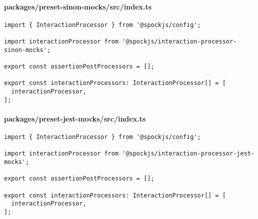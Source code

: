 \paragraph*{packages/preset-sinon-mocks/src/index.ts}
\begin{verbatim}
import { InteractionProcessor } from '@spockjs/config';

import interactionProcessor from '@spockjs/interaction-processor-sinon-mocks';

export const assertionPostProcessors = [];

export const interactionProcessors: InteractionProcessor[] = [
  interactionProcessor,
];
\end{verbatim}

\paragraph*{packages/preset-jest-mocks/src/index.ts}
\begin{verbatim}
import { InteractionProcessor } from '@spockjs/config';

import interactionProcessor from '@spockjs/interaction-processor-jest-mocks';

export const assertionPostProcessors = [];

export const interactionProcessors: InteractionProcessor[] = [
  interactionProcessor,
];
\end{verbatim}

